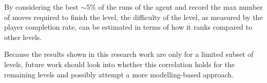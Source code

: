 \documentclass[conference]{IEEEtran}
\begin{document}
By considering the best $\sim$5\% of the runs of the agent and record the max number of moves required to finish the level, the difficulty of the level, as measured by the player completion rate, can be estimated in terms of how it ranks compared to other levels.

Because the results shown in this research work are only for a limited subset of levels, future work should look into whether this correlation holds for the remaining levels and possibly attempt a more modelling-based approach.








\end{document}
